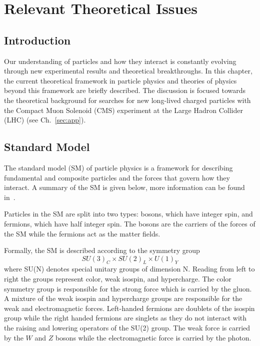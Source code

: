 \chapter{Relevant Theoretical Issues \label{sec:theory}}

\section{Introduction}
Our understanding of particles and how they interact is constantly evolving through new experimental results and theoretical breakthroughs.
In this chapter, the current theoretical framework in particle physics and theories of physics beyond this framework are briefly described.
The discussion is focused towards the theoretical background for searches for new long-lived charged particles with the Compact Muon Solenoid (CMS) experiment
at the Large Hadron Collider (LHC) (see Ch.~\ref{sec:app}).

\section{Standard Model \label{sec:SM}}
The standard model (SM) of particle physics is a framework for describing fundamental and composite particles and the forces that govern how they interact. 
A summary of the SM is given below, more information can be found in~\cite{griffiths2008introduction, Srednicki_2007}.

Particles in the SM are split into two types: bosons, which have integer spin, and fermions, which have half integer spin.
The bosons are the carriers of the forces of the SM while the fermions act as the matter fields.


Formally, the SM is described according to the symmetry group
\begin{equation}
SU(3)_C \times SU(2)_L \times U(1)_Y
\label{eq:SMGroups}
\end{equation}
where SU(N) denotes special unitary groups of dimension N. 
Reading from left to right the groups represent color, weak isospin, and hypercharge. 
The color symmetry group is responsible for the strong force which is carried by the gluon.
A mixture of the weak isospin and hypercharge groups are responsible for the weak and electromagnetic forces. Left-handed fermions are doublets of the
isospin group while the right handed fermions are singlets as they do not interact with the raising and lowering operators of the SU(2) group.
The weak force is carried by the $W$ and $Z$ bosons while the electromagnetic force is carried by the photon.

